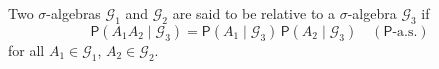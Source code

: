 Two $\sigma$-algebras $\mathcal{G}_1$ and $\mathcal{G}_2$ are said to be  relative to a $\sigma$-algebra $\mathcal{G}_3$ if
$$\mathsf{P}(A_1 A_2 \mid \mathcal{G}_3) = \mathsf{P}(A_1 \mid \mathcal{G}_3)\,\mathsf{P}(A_2 \mid \mathcal{G}_3) \quad (\mathsf{P}\text{-a.s.})$$
for all $A_1 \in \mathcal{G}_1$, $A_2 \in \mathcal{G}_2$.
